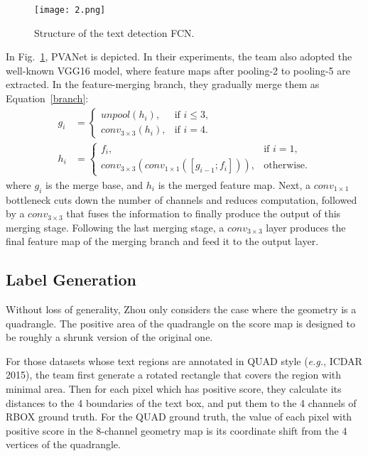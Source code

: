 \documentclass[10pt,twocolumn,letterpaper]{article}
\begin{document}
\begin{figure}
	\begin{center}
		\texttt{[image: 2.png]}
	\end{center}
	\caption{Structure of the text detection FCN.}
	\label{fig:2}
\end{figure}

In Fig.~\ref{fig:2}, PVANet \cite{Kim2016PVANET} is depicted. In their experiments, the team also adopted the well-known VGG16 \cite{Simonyan2014Very} model, where feature maps after pooling-2 to pooling-5 are extracted. In the feature-merging branch, they gradually merge them as Equation~\ref{branch}:
\begin{subequations}
\begin{align}
g_i&=
\begin{cases}
unpool(h_i), & \mbox{if } i\le 3, \\
conv_{3\times 3}(h_i), & \mbox{if } i=4.
\end{cases}  \\
h_i&=
\begin{cases}
f_i, & \mbox{if } i = 1, \\
conv_{3\times 3}(conv_{1\times 1}([g_{i-1};f_i])), & \mbox{otherwise}.
\end{cases}      
\end{align}  \label{branch}
\end{subequations}
where $g_i$ is the merge base, and $h_i$ is the merged feature map. Next, a $conv_{1\times 1}$ bottleneck cuts down the number of channels and reduces computation, followed by a $conv_{3\times 3}$ that fuses the information to finally produce the output of this merging stage. Following the last merging stage, a $conv_{3\times 3}$ layer produces the final feature map of the merging branch and feed it to the output layer.

\subsection{Label Generation}

Without loss of generality, Zhou only considers the case where the geometry is a quadrangle. The positive area of the quadrangle on the score map is designed to be roughly a shrunk version of the original one.

For those datasets whose text regions are annotated in QUAD style (\emph{e.g.}, ICDAR 2015), the team first generate a rotated rectangle that covers the region with minimal area. Then for each pixel which has positive score, they calculate its distances to the 4 boundaries of the text box, and put them to the 4 channels of RBOX ground truth. For the QUAD ground truth, the value of each pixel with positive score in the 8-channel geometry map is its coordinate shift from the 4 vertices of the quadrangle.
\end{document}
